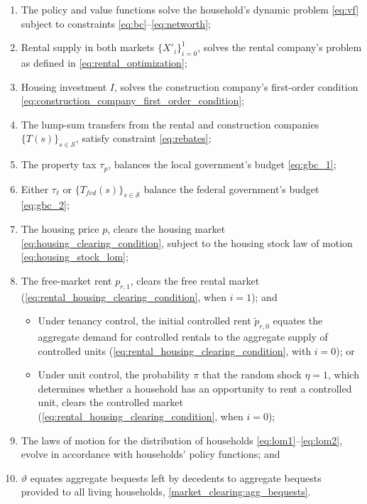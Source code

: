 \documentclass[parskip=full]{article}
\begin{document}
\begin{enumerate}
\item The policy and value functions solve the household's dynamic problem \eqref{eq:vf} subject to constraints \eqref{eq:bc}--\eqref{eq:networth};
\item Rental supply in both markets $\{X'_{i}\}^{1}_{i=0}$, solves the rental company's problem as defined in \eqref{eq:rental_optimization};
\item Housing investment $I$, solves the construction company's first-order condition \eqref{eq:construction_company_first_order_condition};
\item The lump-sum transfers from the rental and construction companies $\{T(s)\}_{s \in \mathcal{S}}$, satisfy constraint \eqref{eq:rebates};
\item The property tax $\tau_p$, balances the local government's budget \eqref{eq:gbc_1};
\item Either $\tau_{\ell}$ or $\{T_{fed}(s)\}_{s\in \mathcal{S}}$ balance the federal government's budget \eqref{eq:gbc_2};
\item The housing price $p$, clears the housing market
\eqref{eq:housing_clearing_condition}, subject to the housing stock law of motion \eqref{eq:housing_stock_lom};
\item The free-market rent $p_{r,1}$, clears the free rental market (\eqref{eq:rental_housing_clearing_condition}, when $i=1$); and
\begin{itemize}
    \item Under tenancy control, the initial controlled rent $\tilde{p}_{r,0}$ equates the aggregate demand for controlled rentals to the aggregate supply of controlled units (\eqref{eq:rental_housing_clearing_condition}, with $i=0$); or
    \item Under unit control, the probability $\pi$ that the random shock $\eta=1$, which determines whether a household has an opportunity to rent a controlled unit, clears the controlled market (\eqref{eq:rental_housing_clearing_condition}, when $i=0$);
\end{itemize}
\item The laws of motion for the distribution of households \eqref{eq:lom1}--\eqref{eq:lom2}, evolve in accordance with households' policy functions; and
\item $\vartheta$ equates aggregate bequests left by decedents to aggregate bequests provided to all living households, \eqref{market_clearing:agg_bequests}.
\end{enumerate}
\end{document}
